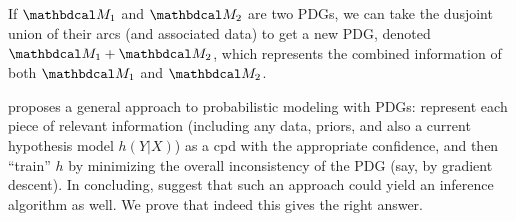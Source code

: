 \documentclass{article}
\begin{document}



\subsection{}

If $\dg M_1$ and $\dg M_2$ are two PDGs, we can take the dusjoint union of their arcs (and associated data) to get a new PDG, denoted $\dg M_1 + \dg M_2$,
which represents the combined information of both $\dg M_1$ and $\dg M_2$.

\textcite{one-true-loss} proposes a general
approach to probabilistic modeling with PDGs: represent each piece of relevant information (including any data, priors, and also a current hypothesis model $h(Y|X)$) as a cpd with the appropriate confidence, and then ``train'' $h$ by minimizing the overall inconsistency of the PDG (say, by gradient descent).
In concluding,
\textcite{pdg-aaai} suggest that such an approach
could yield an inference algorithm as well.
We prove that indeed this gives the right answer.
\end{document}
